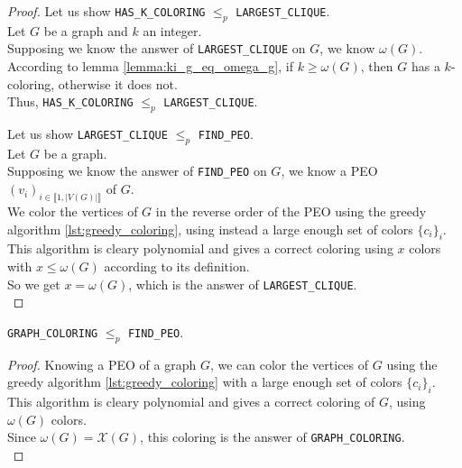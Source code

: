 \begin{proof}
    Let us show \texttt{HAS\_K\_COLORING} $\leq_p$ \texttt{LARGEST\_CLIQUE}. \\
    Let $G$ be a graph and $k$ an integer. \\
    Supposing we know the answer of \texttt{LARGEST\_CLIQUE} on $G$, we know $\omega(G)$. \\
    According to lemma \ref{lemma:ki_g_eq_omega_g}, if $k \geq \omega(G)$, then $G$ has a $k$-coloring, otherwise it does not. \\
    Thus, \texttt{HAS\_K\_COLORING} $\leq_p$ \texttt{LARGEST\_CLIQUE}. \medskip

    Let us show \texttt{LARGEST\_CLIQUE} $\leq_p$ \texttt{FIND\_PEO}. \\
    Let $G$ be a graph. \\
    Supposing we know the answer of \texttt{FIND\_PEO} on $G$, we know a PEO $(v_i)_{i\in\llbracket 1, \mid V(G) \mid \rrbracket}$ of $G$. \\
    We color the vertices of $G$ in the reverse order of the PEO using the greedy algorithm \ref{lst:greedy_coloring}, using instead a large enough set of colors $\{c_i\}_i$. \\
    This algorithm is cleary polynomial and gives a correct coloring using $x$ colors with $x\leq \omega(G)$ according to its definition. \\
    So we get $x=\omega(G)$, which is the answer of \texttt{LARGEST\_CLIQUE}. \\
\end{proof}

\begin{proposition}
    \texttt{GRAPH\_COLORING} $\leq_p$ \texttt{FIND\_PEO}.
\end{proposition}

\begin{proof}
    Knowing a PEO of a graph $G$, we can color the vertices of $G$ using the greedy algorithm \ref{lst:greedy_coloring} with a large enough set of colors $\{c_i\}_i$. \\
    This algorithm is cleary polynomial and gives a correct coloring of $G$, using $\omega(G)$ colors. \\
    Since $\omega(G)=\mathcal{X}(G)$, this coloring is the answer of \texttt{GRAPH\_COLORING}. \\
\end{proof}
